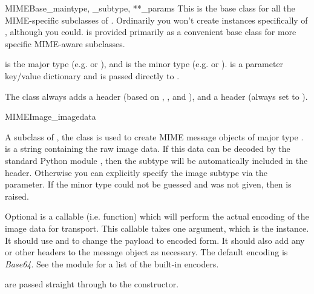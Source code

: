 \begin{classdesc}{MIMEBase}{_maintype, _subtype, **_params}
This is the base class for all the MIME-specific subclasses of
.  Ordinarily you won't create instances specifically
of , although you could.   is provided
primarily as a convenient base class for more specific MIME-aware
subclasses.

 is the  major type
(e.g.  or ), and  is the
 minor type 
(e.g.  or ).   is a parameter
key/value dictionary and is passed directly to
.

The  class always adds a  header
(based on , , and ), and a
 header (always set to ).
\end{classdesc}

\begin{classdesc}{MIMEImage}{_imagedata}

A subclass of , the  class is used to
create MIME message objects of major type .
 is a string containing the raw image data.  If this
data can be decoded by the standard Python module ,
then the subtype will be automatically included in the
 header.  Otherwise you can explicitly specify the
image subtype via the  parameter.  If the minor type could
not be guessed and  was not given, then 
is raised.

Optional  is a callable (i.e. function) which will
perform the actual encoding of the image data for transport.  This
callable takes one argument, which is the  instance.
It should use  and  to
change the payload to encoded form.  It should also add any
 or other headers to the message
object as necessary.  The default encoding is \emph{Base64}.  See the
 module for a list of the built-in encoders.

 are passed straight through to the 
constructor.
\end{classdesc}

